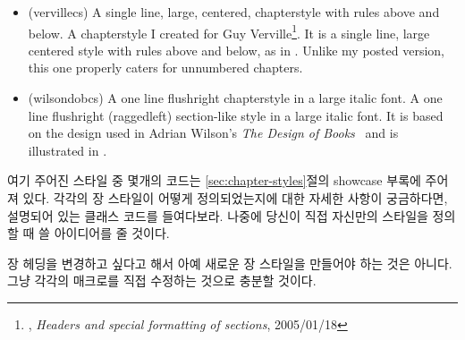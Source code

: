 \begin{itemize}



\item[\cstyle{verville}]
\glossary(vervillecs)%
  {}%
  {A single line, large, centered, chapterstyle with rules above and below.}
 A chapterstyle I created for
  Guy Verville\footnote{\ctt,
  \textit{Headers and special formatting of sections}, 2005/01/18}.
  It is a single line, large centered style with rules above
  and below, as in . Unlike my posted version,
  this one properly caters for unnumbered chapters.


\item[\cstyle{wilsondob}]
\glossary(wilsondobcs)%
  {}%
  {A one line flushright chapterstyle in a large italic font.}
A one line flushright (raggedleft) section-like style in a large italic font.
It is based on the design used in
Adrian Wilson's \textit{The Design of Books}~\cite{ADRIANWILSON93} and
is illustrated in
.


\end{itemize}

여기 주어진 스타일 중 몇개의 코드는 \ref{sec:chapter-styles}절의
showcase 부록에 주어져 있다.
각각의 장 스타일이 어떻게 정의되었는지에 대한 자세한 사항이 궁금하다면,
설명되어 있는 클래스 코드를 들여다보라.
나중에 당신이 직접 자신만의 스타일을 정의할 때 쓸 아이디어를 줄 것이다.

장 헤딩을 변경하고 싶다고 해서 아예 새로운 장 스타일을 만들어야 하는 것은 아니다.
그냥 각각의 매크로를 직접 수정하는 것으로 충분할 것이다.


